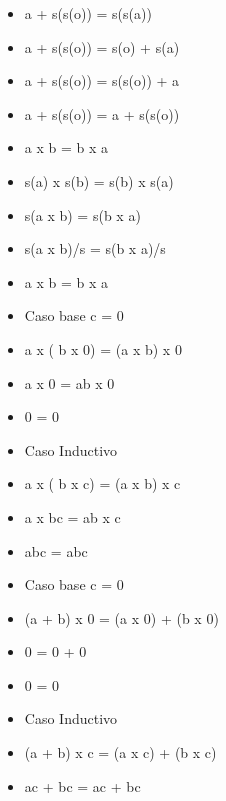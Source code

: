 \documentclass{article}
\begin{document}
\begin{itemize}
\newline
\item a + s(s(o)) = s(s(a))
\item a + s(s(o)) = s(o) + s(a)
\item a + s(s(o)) = s(s(o)) + a
\item a + s(s(o)) = a + s(s(o))
\newline
\newline
\item a x b = b x a
\item s(a) x s(b) = s(b) x s(a)
\item s(a x b) = s(b x a)
\item s(a x b)/s = s(b x a)/s
\item a x b = b x a
\newline
\newline
\item Caso base c = 0
\item a x ( b x 0) = (a x b) x 0
\item a x 0 = ab x 0
\item 0 = 0 
\newline
\item Caso Inductivo 
\item a x ( b x c) = (a x b) x c
\item a x bc = ab x c
\item abc = abc
\newline
\newline
\item Caso base c = 0
\item (a + b) x 0 = (a x 0) + (b x 0)
\item 0 = 0 + 0
\item 0 = 0
\newline
\item Caso Inductivo
\item (a + b) x c = (a x c) + (b x c)
\item ac + bc = ac + bc


\end{itemize}
\end{document}
